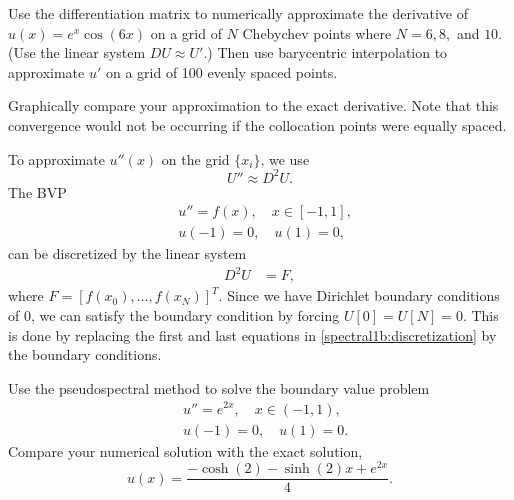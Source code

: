 \begin{problem}
Use the differentiation matrix to numerically approximate the derivative of $u(x) = e^{x}\cos(6x)$ on a grid of $N$ Chebychev points where $N=6, 8,$ and $10.$
(Use the linear system $D U \approx U'$.)
Then use barycentric interpolation to approximate $u'$ on a grid of 100 evenly spaced points.

Graphically compare your approximation to the exact derivative.
Note that this convergence would not be occurring if the collocation points were equally spaced.
\end{problem}

To approximate $u''(x)$ on the grid $\{x_i\}$, we use
\[U'' \approx D^2 U.\]
The BVP
\begin{align*}
&{ }u'' = f(x), \quad x \in [-1,1],\\
&{ }u(-1) = 0, \quad u(1) = 0,
\end{align*}
can be discretized by the linear system
\begin{align}
	D^2 U &= F, \label{spectral1b:discretization}
\end{align}
where $F = [f(x_0),\ldots, f(x_N)]^T$.
Since we have Dirichlet boundary conditions of $0$, we can satisfy the boundary condition by forcing $U[0] = U[N] = 0$.
This is done by replacing the first and last equations in \eqref{spectral1b:discretization} by the boundary conditions.


\begin{problem}
Use the pseudospectral method to solve the boundary value problem
\begin{align*}
&{ } u'' = e^{2x}, \quad x \in (-1,1), \\
&{ } u(-1) = 0, \quad u(1) = 0.
\end{align*}
Compare your numerical solution with the exact solution,
\[
u(x) = \frac{- \cosh(2) - \sinh(2)x + e^{2x}}{4}.
\]
\end{problem}





